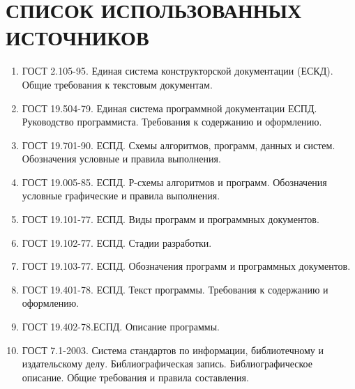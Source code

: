 \newpage

\section*{СПИСОК ИСПОЛЬЗОВАННЫХ ИСТОЧНИКОВ}
{}

\begin{enumerate}
    \item ГОСТ 2.105-95. Единая система конструкторской документации (ЕСКД). Общие требования к текстовым документам. 
    \item ГОСТ 19.504-79. Единая система программной документации ЕСПД. Руководство программиста. Требования к содержанию и оформлению.
    \item ГОСТ 19.701-90. ЕСПД. Схемы алгоритмов, программ, данных и систем. Обозначения условные и правила выполнения.
    \item ГОСТ 19.005-85. ЕСПД. 
    Р-схемы алгоритмов и программ. Обозначения условные графические и правила выполнения.
    \item ГОСТ 19.101-77. ЕСПД. Виды программ и программных документов.
    \item ГОСТ 19.102-77. ЕСПД. Стадии разработки.
    \item ГОСТ 19.103-77. ЕСПД.  Обозначения программ и программных документов.
    \item ГОСТ 19.401-78. ЕСПД. Текст программы. Требования к содержанию и оформлению.
    \item ГОСТ 19.402-78.ЕСПД. Описание программы.
    \item ГОСТ 7.1-2003. Система стандартов по информации, библиотечному и издательскому делу. Библиографическая запись. Библиографическое описание. Общие требования и правила составления. 
\end{enumerate}
